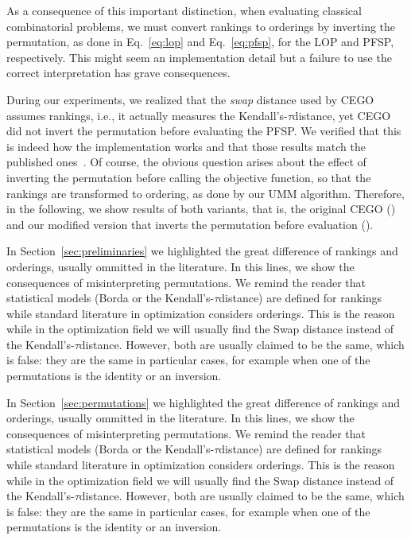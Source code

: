 \documentclass[sigconf,dvipsnames]{acmart}
\newcommand{\ken}{Kendall's-$\tau$}
\begin{document}
As a consequence of this important distinction, when evaluating classical
combinatorial problems, we must convert rankings to orderings by inverting the
permutation, as done in Eq.~\ref{eq:lop} and Eq.~\ref{eq:pfsp}, for the LOP and
PFSP, respectively. This might seem an implementation detail but a failure to use the correct interpretation has grave consequences.

During our experiments, we realized that the \emph{swap} distance used by CEGO
assumes rankings, i.e., it actually measures the \ken distance, yet CEGO did
not invert the permutation before evaluating the PFSP. We verified that this is
indeed how the implementation works and that those results match the published
ones~\citep{ZaeStoBar2014:ppsn}. Of course, the obvious question arises about the effect of inverting the permutation before calling the objective
function, so that the rankings are transformed to ordering, as done by our UMM
algorithm. Therefore, in the following, we show results of both variants, that is, the original CEGO (\CEGOorig) and our modified version that inverts the permutation before evaluation (\CEGOinv).


In Section~\ref{sec:preliminaries} we highlighted the great difference of rankings and orderings, usually ommitted in the literature. In this lines, we show the consequences of misinterpreting permutations. We remind the reader that statistical models (Borda or the \ken distance) are defined for rankings while standard literature in optimization considers orderings. This is the reason while in the optimization field we will usually find the Swap distance instead of the \ken distance. However, both are usually claimed to be the same, which is false: they are the same in particular cases, for example when  one of the permutations is the identity or an inversion. 


In Section~\ref{sec:permutations} we highlighted the great difference of rankings and orderings, usually ommitted in the literature. In this lines, we show the consequences of misinterpreting permutations. We remind the reader that statistical models (Borda or the \ken distance) are defined for rankings while standard literature in optimization considers orderings. This is the reason while in the optimization field we will usually find the Swap distance instead of the \ken distance. However, both are usually claimed to be the same, which is false: they are the same in particular cases, for example when  one of the permutations is the identity or an inversion. 
 
\end{document}
